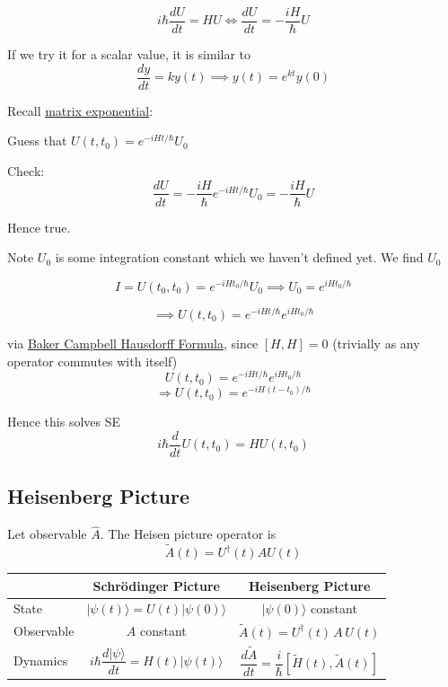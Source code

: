 \documentclass[
]{article}
\let\oldhyperref\hyperref
\renewcommand{\hyperref}[2][]{\oldhyperref[#1]{\underline{#2}}}
\providecommand{\Rarr}{\Rightarrow}
\begin{document}
\[i\hbar\frac{dU}{dt} = HU \iff \frac{dU}{dt} = -\frac{iH}{\hbar}U\]

If we try it for a scalar value, it is similar to
\[
	\frac{dy}{dt} = ky(t) \implies y(t) = e^{kt}y(0)
\]

Recall \hyperref[matrix-exponentials]{matrix exponential}:

Guess that $U(t,t_0) = e^{-iHt/\hbar}U_0$

Check:
\[\frac{dU}{dt} = -\frac{iH}{\hbar}e^{-iHt/\hbar}U_0 = -\frac{iH}{\hbar}U \]

Hence true.

Note $U_0$ is some integration constant which we haven't defined yet.
We find $U_0$

\[I = U(t_0,t_0) = e^{-iHt_0/\hbar}U_0 \implies U_0 = e^{iHt_0/\hbar}\]

\[\implies U(t,t_0) = e^{-iHt/\hbar}e^{iHt_0/\hbar}\]

via \hyperref[baker-campbell-hausdorff-formula]{Baker Campbell Hausdorff Formula}, since $[H,H]=0$ (trivially as any operator commutes with itself)
\[
	U(t,t_0) = e^{-iHt/\hbar}e^{iHt_0/\hbar}
\]
\[
	\Rarr\boxed{U(t,t_0) = e^{-iH(t-t_0)/\hbar}}
\]

Hence this solves SE
\[
	i\hbar \frac{d}{dt}U(t,t_0) = HU(t,t_0)
\]
\subsection{Heisenberg Picture}\label{heisenberg-picture}

Let observable $\hat{A}$. The Heisen picture operator is
\[
	\tilde{A}(t)=U^\dag (t)AU(t)
\]

\begin{tabular}{|l|c|c|}
	\hline
	           & Schrödinger Picture                                     & Heisenberg Picture                                                      \\
	\hline
	State      & $|\psi(t)\rangle = U(t)|\psi(0)\rangle$                 & $|\psi(0)\rangle$ constant                                              \\
	Observable & $A$ constant                                            & $\tilde{A}(t) = U^\dagger(t)\, A\, U(t)$                                \\
	Dynamics   & $i\hbar\dfrac{d|\psi\rangle}{dt} = H(t)|\psi(t)\rangle$ & $\dfrac{d\tilde{A}}{dt} = \dfrac{i}{\hbar}[\tilde{H}(t), \tilde{A}(t)]$ \\
	\hline
\end{tabular}
\end{document}
